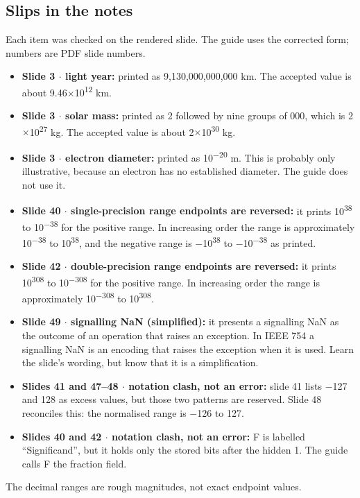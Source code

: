 \documentclass[11pt]{article}
\begin{document}
\begin{keepsection}
\section{Slips in the notes}

Each item was checked on the rendered slide. The guide uses the corrected form; numbers are PDF slide numbers.

\begin{itemize}
\item \textbf{Slide 3 \ensuremath{\cdot} light year:} printed as 9,130,000,000,000 km. The accepted value is about 9.46\ensuremath{\times}10\textsuperscript{12} km.
\item \textbf{Slide 3 \ensuremath{\cdot} solar mass:} printed as 2 followed by nine groups of 000, which is 2\ensuremath{\times}10\textsuperscript{27} kg. The accepted value is about 2\ensuremath{\times}10\textsuperscript{30} kg.
\item \textbf{Slide 3 \ensuremath{\cdot} electron diameter:} printed as 10\textsuperscript{\ensuremath{-}20} m. This is probably only illustrative, because an electron has no established diameter. The guide does not use it.
\item \textbf{Slide 40 \ensuremath{\cdot} single-precision range endpoints are reversed:} it prints 10\textsuperscript{38} to 10\textsuperscript{\ensuremath{-}38} for the positive range. In increasing order the range is approximately 10\textsuperscript{\ensuremath{-}38} to 10\textsuperscript{38}, and the negative range is \ensuremath{-}10\textsuperscript{38} to \ensuremath{-}10\textsuperscript{\ensuremath{-}38} as printed.
\item \textbf{Slide 42 \ensuremath{\cdot} double-precision range endpoints are reversed:} it prints 10\textsuperscript{308} to 10\textsuperscript{\ensuremath{-}308} for the positive range. In increasing order the range is approximately 10\textsuperscript{\ensuremath{-}308} to 10\textsuperscript{308}.
\item \textbf{Slide 49 \ensuremath{\cdot} signalling NaN (simplified):} it presents a signalling NaN as the outcome of an operation that raises an exception. In IEEE 754 a signalling NaN is an encoding that raises the exception when it is used. Learn the slide’s wording, but know that it is a simplification.
\item \textbf{Slides 41 and 47–48 \ensuremath{\cdot} notation clash, not an error:} slide 41 lists \ensuremath{-}127 and 128 as excess values, but those two patterns are reserved. Slide 48 reconciles this: the normalised range is \ensuremath{-}126 to 127.
\item \textbf{Slides 40 and 42 \ensuremath{\cdot} notation clash, not an error:} F is labelled “Significand”, but it holds only the stored bits after the hidden 1. The guide calls F the fraction field.
\end{itemize}

The decimal ranges are rough magnitudes, not exact endpoint values.
\end{keepsection}
\end{document}
